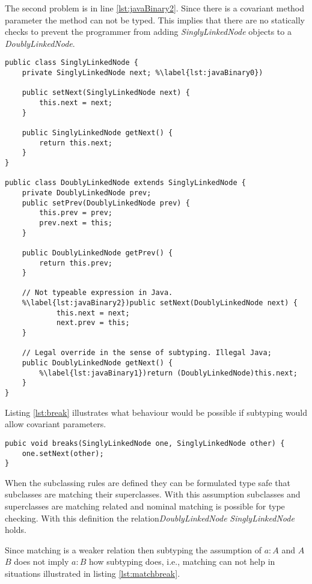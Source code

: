The second problem is in line \ref{lst:javaBinary2}. Since there is a covariant 
method parameter the method can not be typed. This implies that there are no statically
checks to prevent the programmer from adding \emph{SinglyLinkedNode} objects to a 
\emph{DoublyLinkedNode}.

\begin{lstlisting}[caption={Illegal subtyping of binary methods in Java},label={lst:javaBinary}]
public class SinglyLinkedNode {
	private SinglyLinkedNode next; %\label{lst:javaBinary0})

	public setNext(SinglyLinkedNode next) {
		this.next = next;
	}

	public SinglyLinkedNode getNext() {
		return this.next;
	}
}

public class DoublyLinkedNode extends SinglyLinkedNode {
	private DoublyLinkedNode prev;
	public setPrev(DoublyLinkedNode prev) {
		this.prev = prev;
		prev.next = this;
	}

	public DoublyLinkedNode getPrev() {
		return this.prev;
	}
	
	// Not typeable expression in Java.
	%\label{lst:javaBinary2})public setNext(DoublyLinkedNode next) {
			this.next = next;
			next.prev = this;
	}

	// Legal override in the sense of subtyping. Illegal Java;
	public DoublyLinkedNode getNext() {
		%\label{lst:javaBinary1})return (DoublyLinkedNode)this.next;
	}
}
\end{lstlisting}

Listing \ref{lst:break} illustrates what behaviour would be possible if subtyping 
would allow covariant parameters.

\begin{lstlisting}[label={lst:break},caption={Breaking a doubly linked node}]
pubic void breaks(SinglyLinkedNode one, SinglyLinkedNode other) {
	one.setNext(other);
}
\end{lstlisting}

When the subclassing rules are defined they can be formulated
type safe that subclasses are matching their superclasses. With
this assumption subclasses and superclasses are matching related and
nominal matching is possible for type checking. With this definition
the relation\emph{DoublyLinkedNode} \match \emph{SinglyLinkedNode} holds.

Since matching is a weaker relation then subtyping the assumption of $a:A$
and $A$ \match $B$ does not imply $a:B$ how subtyping does, i.e., matching
can not help in situations illustrated in listing \ref{lst:matchbreak}.

